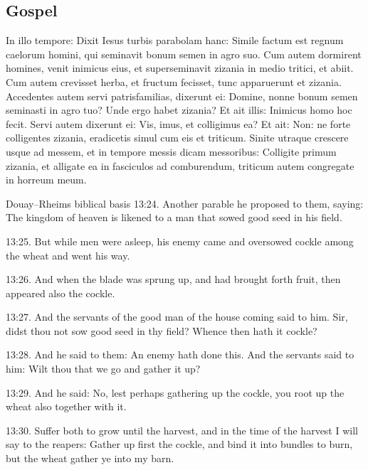 \subsection{Gospel}
\label{proper-gospel}
\begin{latinproper}
In illo tempore: Dixit Iesus turbis parabolam hanc: Simile factum est regnum caelorum homini, qui seminavit bonum semen in agro suo. Cum autem dormirent homines, venit inimicus eius, et superseminavit zizania in medio tritici, et abiit. Cum autem crevisset herba, et fructum fecisset, tunc apparuerunt et zizania. Accedentes autem servi patrisfamilias, dixerunt ei: Domine, nonne bonum semen seminasti in agro tuo? Unde ergo habet zizania? Et ait illis: Inimicus homo hoc fecit. Servi autem dixerunt ei: Vis, imus, et colligimus ea? Et ait: Non: ne forte colligentes zizania, eradicetis simul cum eis et triticum. Sinite utraque crescere usque ad messem, et in tempore messis dicam messoribus: Colligite primum zizania, et alligate ea in fasciculos ad comburendum, triticum autem congregate in horreum meum.
\end{latinproper}
\begin{englishwitness}{Douay--Rheims biblical basis}
13:24. Another parable he proposed to them, saying: The kingdom of
heaven is likened to a man that sowed good seed in his field.

13:25. But while men were asleep, his enemy came and oversowed cockle
among the wheat and went his way.

13:26. And when the blade was sprung up, and had brought forth fruit,
then appeared also the cockle.

13:27. And the servants of the good man of the house coming said to
him. Sir, didst thou not sow good seed in thy field? Whence then hath
it cockle?

13:28. And he said to them: An enemy hath done this. And the servants
said to him: Wilt thou that we go and gather it up?

13:29. And he said: No, lest perhaps gathering up the cockle, you root
up the wheat also together with it.

13:30. Suffer both to grow until the harvest, and in the time of the
harvest I will say to the reapers: Gather up first the cockle, and bind
it into bundles to burn, but the wheat gather ye into my barn.
\end{englishwitness}

